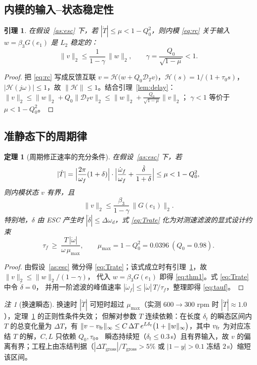 \documentclass[11pt,a4paper]{article}
\newtheorem{lemma}{引理}
\newtheorem{theorem}{定理}
\theoremstyle{remark}
\newtheorem{remark}{注}
\newcommand{\Tg}{T_{\mathrm{gross}}}
\begin{document}
\subsection{内模的输入--状态稳定性}
\begin{lemma}\label{lem:iss}
在假设~\ref{as:esc} 下，若 $|\dot T|\le\mu<1-Q_0^{2}$，则内模 \eqref{eq:rc} 关于输入 $w=\beta_3G(e_1)$ 是 $L_2$ 稳定的：
\begin{equation}
\|v\|_2\le\frac{1}{1-\gamma}\,\|w\|_2,\qquad \gamma=\frac{Q_0}{\sqrt{1-\mu}}<1 .
\label{eq:iss}
\end{equation}
\end{lemma}
\begin{proof}
把 \eqref{eq:rc} 写成反馈互联 $v=\mathcal H\bigl(w+Q_0\mathcal D_T v\bigr)$，$\mathcal H(s)=1/(1+\tau_0 s)$，
$|\mathcal H(j\omega)|\le1$，故 $\|\mathcal H\|\le1$。结合引理~\ref{lem:delay}：
$\|v\|_2\le\|w\|_2+Q_0\|\mathcal D_T v\|_2\le\|w\|_2+\frac{Q_0}{\sqrt{1-\mu}}\|v\|_2$；
$\gamma<1$ 等价于 $\mu<1-Q_0^{2}$。
\end{proof}

\subsection{准静态下的周期律}
\begin{theorem}[周期修正速率的充分条件]\label{thm:T}
在假设~\ref{as:esc} 下，若
\begin{equation}
|\dot T|=\Bigl|\frac{2\pi}{\omega_f}(1+\delta)\Bigr|\cdot\Bigl|\frac{\dot\omega_f}{\omega_f}+\frac{\dot\delta}{1+\delta}\Bigr|
\le\mu<1-Q_0^{2},
\label{eq:Trate}
\end{equation}
则内模状态 $v$ 有界，且
\begin{equation}
\|v\|_2\le\frac{\beta_3}{1-\gamma}\,\bigl\|G(e_1)\bigr\|_2 .
\label{eq:thm1}
\end{equation}
特别地，$\delta$ 由 ESC 产生时 $|\dot\delta|\le\Delta\omega_d$，式 \eqref{eq:Trate} 化为对测速滤波的显式设计约束
\begin{equation}
\tau_f\ \ge\ \frac{T\,|\dot\omega|}{\omega\,\mu_{\max}},\qquad \mu_{\max}=1-Q_0^{2}=0.0396\ (Q_0=0.98).
\label{eq:tauf}
\end{equation}
\end{theorem}
\begin{proof}
由假设~\ref{as:esc} 微分得 \eqref{eq:Trate}；该式成立时有引理~\ref{lem:iss}，故 $\|v\|_2\le\|w\|_2/(1-\gamma)$，
代入 $w=\beta_3G(e_1)$ 即得 \eqref{eq:thm1}。式 \eqref{eq:Trate} 中令 $\dot\delta=0$，
并用一阶滤波的峰值速率 $|\dot\omega_f|\le|\dot\omega|\,T/\tau_f$，整理即得 \eqref{eq:tauf}。
\end{proof}
\begin{remark}[换速瞬态]\label{rem:transient}
换速时 $|\dot T|$ 可短时超过 $\mu_{\max}$（实测 $600\to300$ rpm 时 $|\dot T|\approx1.0$），定理~\ref{thm:T} 的正则性条件失效；
但解对参数 $T$ 连续依赖：在长度 $\delta_t$ 的瞬态区间内 $T$ 的总变化量为 $\Delta T$，有
$\|v-v_{\rm fr}\|_\infty\le C\,\Delta T\,e^{L\delta_t}\bigl(1+\|w\|_\infty\bigr)$，其中 $v_{\rm fr}$ 为对应冻结 $T$ 的解，$C,L$ 只依赖 $Q_0,\tau_0$。
瞬态持续短（$\delta_t\le0.3$\,s）且有界输入，故 $v$ 的偏离有界；工程上由冻结判据（$|\Delta\Tg|/\Tg>5\%$ 或 $|1-y|>0.1$ 冻结 $2$\,s）缩短该区间。
\end{remark}
\end{document}
